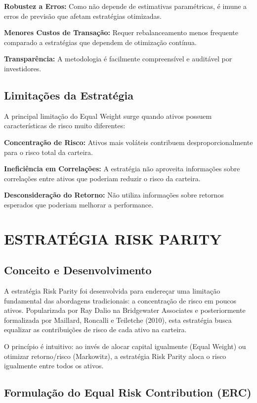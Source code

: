 \textbf{Robustez a Erros:} Como não depende de estimativas paramétricas, é imune a erros de previsão que afetam estratégias otimizadas.

\textbf{Menores Custos de Transação:} Requer rebalanceamento menos frequente comparado a estratégias que dependem de otimização contínua.

\textbf{Transparência:} A metodologia é facilmente compreensível e auditável por investidores.

\subsection{Limitações da Estratégia}

A principal limitação do Equal Weight surge quando ativos possuem características de risco muito diferentes:

\textbf{Concentração de Risco:} Ativos mais voláteis contribuem desproporcionalmente para o risco total da carteira.

\textbf{Ineficiência em Correlações:} A estratégia não aproveita informações sobre correlações entre ativos que poderiam reduzir o risco da carteira.

\textbf{Desconsideração do Retorno:} Não utiliza informações sobre retornos esperados que poderiam melhorar a performance.

\section{ESTRATÉGIA RISK PARITY}

\subsection{Conceito e Desenvolvimento}

A estratégia Risk Parity foi desenvolvida para endereçar uma limitação fundamental das abordagens tradicionais: a concentração de risco em poucos ativos. Popularizada por Ray Dalio na Bridgewater Associates e posteriormente formalizada por Maillard, Roncalli e Teiletche (2010), esta estratégia busca equalizar as contribuições de risco de cada ativo na carteira.

O princípio é intuitivo: ao invés de alocar capital igualmente (Equal Weight) ou otimizar retorno/risco (Markowitz), a estratégia Risk Parity aloca o risco igualmente entre todos os ativos.

\subsection{Formulação do Equal Risk Contribution (ERC)}

